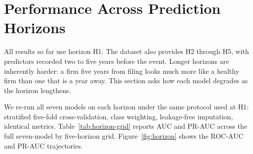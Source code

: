 \documentclass[12pt,a4paper]{article}
\begin{document}
\clearpage
\section{Performance Across Prediction Horizons}\label{sec:horizons}

All results so far use horizon H1. The dataset also provides H2 through H5,
with predictors recorded two to five years before the event. Longer horizons
are inherently harder: a firm five years from filing looks much more like a
healthy firm than one that is a year away. This section asks how each model
degrades as the horizon lengthens.

We re-run all seven models on each horizon under the same protocol used at H1:
stratified five-fold cross-validation, class weighting, leakage-free
imputation, identical metrics. Table~\ref{tab:horizon-grid} reports AUC and
PR-AUC across the full seven-model by five-horizon grid. Figure~\ref{fig:horizon}
shows the ROC-AUC and PR-AUC trajectories.
\end{document}
